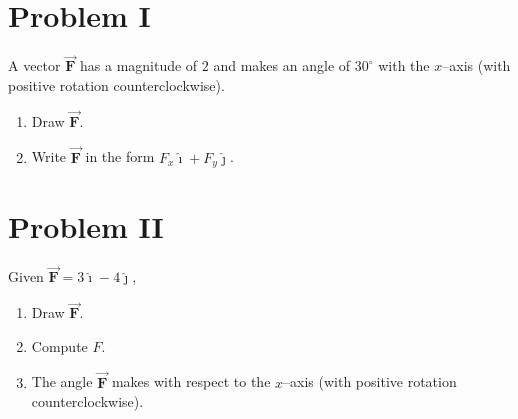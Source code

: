 \documentclass{article}
\newif\ifsolutions
\newcommand{\ds}[0]{\displaystyle}
\newcommand{\ihat}[0]{\hat{\boldsymbol{\imath}}}
\newcommand{\jhat}[0]{\hat{\boldsymbol{\jmath}}}
\newcommand{\bfvec}[1]{\vec{\mathbf{#1}}}
\begin{document}
\section{Problem I}

A vector $\bfvec{F}$ has a magnitude of $2$ and makes an angle of $30^\circ$ with the $x$--axis (with positive rotation counterclockwise).

\begin{enumerate}

  \item Draw $\bfvec{F}$.

  \item Write $\bfvec{F}$ in the form $F_x\ihat + F_y\jhat$.

\end{enumerate}

\ifsolutions
\textbf{Solution}

    \begin{enumerate}

      \item 

            

      \item $\bfvec{F} = 2\cos(30^\circ)\ihat + 2\sin(30^\circ)\jhat=\sqrt{3}\ihat + \jhat$, where $\cos(30^\circ)=\sqrt{3}/2$ and $\sin(30^\circ)=1/2$ was used in the last step.

    \end{enumerate}
\else


\fi

\section{Problem II}

Given $\bfvec{F}=3\ihat - 4\jhat$,

\begin{enumerate}

  \item Draw $\bfvec{F}$.

  \item Compute $F$.

  \item The angle  $\bfvec{F}$ makes with respect to the $x$--axis (with positive rotation counterclockwise).

\end{enumerate}

\ifsolutions
\textbf{Solution}

    \begin{enumerate}

      \item 

            

      \item $F=\sqrt{3^2+4^2}=5$

      \item $\ds\theta = 360^\circ - \phi = 360^\circ - \frac{180}{\pi}\tan^{-1}(4/3)\simeq 307^\circ$

    \end{enumerate}
\else


\fi
\end{document}
